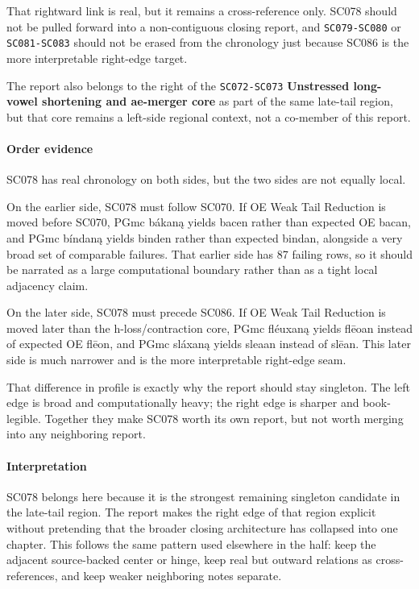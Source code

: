\documentclass[
  british,
  a4paper,
]{article}
\begin{document}
That rightward link is real, but it remains a cross-reference only.
SC078 should not be pulled forward into a non-contiguous closing report,
and \texttt{SC079-SC080} or \texttt{SC081-SC083} should not be erased
from the chronology just because SC086 is the more interpretable
right-edge target.

The report also belongs to the right of the \texttt{SC072-SC073}
\textbf{Unstressed long-vowel shortening and ae-merger core} as part of
the same late-tail region, but that core remains a left-side regional
context, not a co-member of this report.

\paragraph{Order evidence}\label{order-evidence-48}

SC078 has real chronology on both sides, but the two sides are not
equally local.

On the earlier side, SC078 must follow SC070. If OE Weak Tail Reduction
is moved before SC070, PGmc bákaną yields bacen rather than expected OE
bacan, and PGmc bíndaną yields binden rather than expected bindan,
alongside a very broad set of comparable failures. That earlier side has
87 failing rows, so it should be narrated as a large computational
boundary rather than as a tight local adjacency claim.

On the later side, SC078 must precede SC086. If OE Weak Tail Reduction
is moved later than the h-loss/contraction core, PGmc fléuxaną yields
flēoan instead of expected OE flēon, and PGmc sláxaną yields sleaan
instead of slēan. This later side is much narrower and is the more
interpretable right-edge seam.

That difference in profile is exactly why the report should stay
singleton. The left edge is broad and computationally heavy; the right
edge is sharper and book-legible. Together they make SC078 worth its own
report, but not worth merging into any neighboring report.

\paragraph{Interpretation}\label{interpretation-48}

SC078 belongs here because it is the strongest remaining singleton
candidate in the late-tail region. The report makes the right edge of
that region explicit without pretending that the broader closing
architecture has collapsed into one chapter. This follows the same
pattern used elsewhere in the half: keep the adjacent source-backed
center or hinge, keep real but outward relations as cross-references,
and keep weaker neighboring notes separate.
\end{document}
